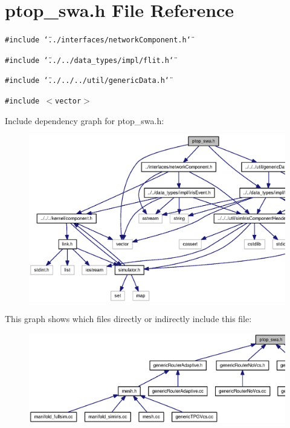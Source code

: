 \section{ptop\_\-swa.h File Reference}
\label{ptop__swa_8h}
{\tt \#include \char`\"{}../interfaces/networkComponent.h\char`\"{}}\par
{\tt \#include \char`\"{}../../data\_\-types/impl/flit.h\char`\"{}}\par
{\tt \#include \char`\"{}../../../util/genericData.h\char`\"{}}\par
{\tt \#include $<$vector$>$}\par


Include dependency graph for ptop\_\-swa.h:\nopagebreak
\begin{figure}[H]
\begin{center}
\leavevmode
\includegraphics[width=361pt]{ptop__swa_8h__incl}
\end{center}
\end{figure}


This graph shows which files directly or indirectly include this file:\nopagebreak
\begin{figure}[H]
\begin{center}
\leavevmode
\includegraphics[width=383pt]{ptop__swa_8h__dep__incl}
\end{center}
\end{figure}
